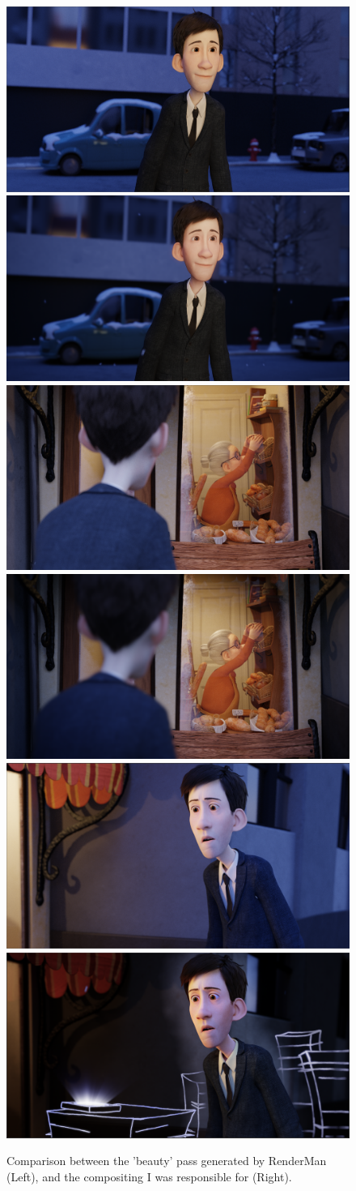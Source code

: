 \documentclass[11pt]{article}
\begin{document}
\begin{figure}[htbp]
\centering
\includegraphics[width=0.48\linewidth]{images/shot020_precomp.png}
\hfill
\includegraphics[width=0.48\linewidth]{images/shot020_comp.png}
\newline
\newline
\includegraphics[width=0.48\linewidth]{images/shot030_precomp.png}
\hfill
\includegraphics[width=0.48\linewidth]{images/shot030_comp.png}
\newline
\newline
\includegraphics[width=0.48\linewidth]{images/shot040_precomp.png}
\hfill
\includegraphics[width=0.48\linewidth]{images/shot040_comp.png}
\caption{\label{figure:compcomparison} Comparison between the 'beauty' pass generated by RenderMan (Left), and the compositing I was responsible for (Right).}
\end{figure}
\end{document}
